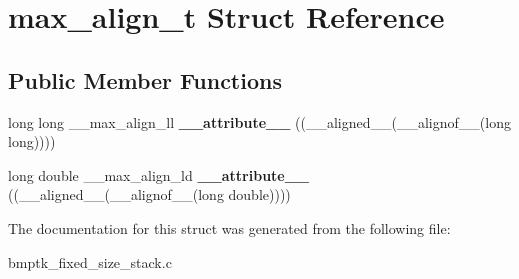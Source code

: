 \hypertarget{structmax__align__t}{}\section{max\+\_\+align\+\_\+t Struct Reference}
\label{structmax__align__t}
\subsection*{Public Member Functions}
\begin{DoxyCompactItemize}
\item 
long long \+\_\+\+\_\+max\+\_\+align\+\_\+ll {\bfseries \+\_\+\+\_\+attribute\+\_\+\+\_\+} ((\+\_\+\+\_\+aligned\+\_\+\+\_\+(\+\_\+\+\_\+alignof\+\_\+\+\_\+(long long))))\hypertarget{structmax__align__t_a9c2a8a1e8efae947243c5e8efd95123e}{}\label{structmax__align__t_a9c2a8a1e8efae947243c5e8efd95123e}

\item 
long double \+\_\+\+\_\+max\+\_\+align\+\_\+ld {\bfseries \+\_\+\+\_\+attribute\+\_\+\+\_\+} ((\+\_\+\+\_\+aligned\+\_\+\+\_\+(\+\_\+\+\_\+alignof\+\_\+\+\_\+(long double))))\hypertarget{structmax__align__t_a10d1b6c9f88535237d223c3be5232720}{}\label{structmax__align__t_a10d1b6c9f88535237d223c3be5232720}

\end{DoxyCompactItemize}


The documentation for this struct was generated from the following file\+:\begin{DoxyCompactItemize}
\item 
bmptk\+\_\+fixed\+\_\+size\+\_\+stack.\+c\end{DoxyCompactItemize}
